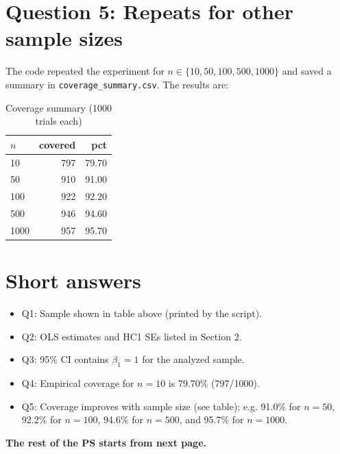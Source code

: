 \documentclass[11pt]{article}
\begin{document}
\section*{Question 5: Repeats for other sample sizes}
The code repeated the experiment for $n\in\{10,50,100,500,1000\}$ and saved a summary in \verb|coverage_summary.csv|. The results are:
\begin{table}[h]
\centering
\caption{Coverage summary (1000 trials each)}
\begin{tabular}{@{}lrr@{}}
\toprule
$n$ & covered & pct \\
\midrule
10 & 797 & 79.70 \\
50 & 910 & 91.00 \\
100 & 922 & 92.20 \\
500 & 946 & 94.60 \\
1000 & 957 & 95.70 \\
\bottomrule
\end{tabular}
\end{table}

\section*{Short answers}
\begin{itemize}
  \item Q1: Sample shown in table above (printed by the script).
  \item Q2: OLS estimates and HC1 SEs listed in Section 2.
  \item Q3: 95\% CI contains $\beta_1=1$ for the analyzed sample.
  \item Q4: Empirical coverage for $n=10$ is 79.70\% (797/1000).
  \item Q5: Coverage improves with sample size (see table); e.g. 91.0\% for $n=50$, 92.2\% for $n=100$, 94.6\% for $n=500$, and 95.7\% for $n=1000$.
\end{itemize}


\textbf{The rest of the PS starts from next page.}
\end{document}
